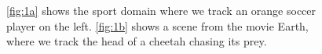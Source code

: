 \documentclass[11pt]{article}
\begin{document}
\begin{figure}
\centering
{}
\caption{\ref{fig:1a} shows the sport domain where we track an orange soccer
player on the left. \ref{fig:1b} shows a scene from the movie Earth, where we
track the head of a cheetah chasing its prey.}
\label{fig:videos}
\end{figure}
\end{document}
